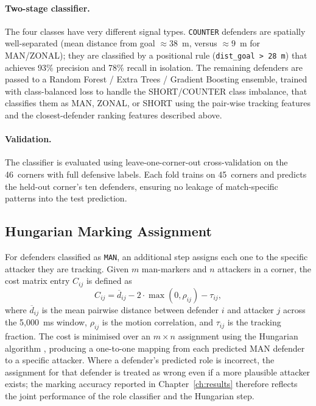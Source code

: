 \paragraph{Two-stage classifier.}
The four classes have very different signal types. \texttt{COUNTER} defenders
are spatially well-separated (mean distance from goal $\approx 38$~m, versus
$\approx 9$~m for MAN/ZONAL); they are classified by a positional rule
(\texttt{dist\_goal\,>\,28~m}) that achieves 93\% precision and 78\% recall in
isolation. The remaining defenders are passed to a Random Forest / Extra Trees
/ Gradient Boosting ensemble, trained with class-balanced loss to handle the
SHORT/COUNTER class imbalance, that classifies them as MAN, ZONAL, or SHORT
using the pair-wise tracking features and the closest-defender ranking features
described above.

\paragraph{Validation.}
The classifier is evaluated using leave-one-corner-out cross-validation on the
46~corners with full defensive labels. Each fold trains on 45~corners and
predicts the held-out corner's ten defenders, ensuring no leakage of
match-specific patterns into the test prediction.

\subsection{Hungarian Marking Assignment}
\label{sec:sq1_marking}

For defenders classified as \texttt{MAN}, an additional step assigns each one
to the specific attacker they are tracking. Given $m$ man-markers and $n$
attackers in a corner, the cost matrix entry $C_{ij}$ is defined as
\begin{equation}
  C_{ij} = \overline{d}_{ij} - 2 \cdot \max(0, \rho_{ij}) - \tau_{ij},
  \label{eq:marking_cost}
\end{equation}
where $\overline{d}_{ij}$ is the mean pairwise distance between defender $i$ and
attacker $j$ across the 5,000~ms window, $\rho_{ij}$ is the motion correlation,
and $\tau_{ij}$ is the tracking fraction. The cost is minimised over an
$m \times n$ assignment using the Hungarian algorithm
\citep{Kuhn1955}, producing a one-to-one mapping from each predicted MAN
defender to a specific attacker. Where a defender's predicted role is incorrect,
the assignment for that defender is treated as wrong even if a more plausible
attacker exists; the marking accuracy reported in
Chapter~\ref{ch:results} therefore reflects the joint performance of the role
classifier and the Hungarian step.

